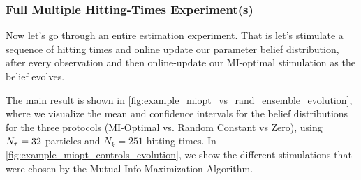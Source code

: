 \subsubsection{Full Multiple Hitting-Times Experiment(s)}
Now let's go through an entire estimation experiment. That is let's stimulate a
sequence of hitting times and online update our parameter belief distribution,
after every observation and then online-update our MI-optimal stimulation as the
belief evolves.

The main result is shown in \cref{fig:example_miopt_vs_rand_ensemble_evolution},
where we visualize the mean and confidence intervals for the belief
distributions for the three protocols (MI-Optimal vs. Random Constant vs Zero),
using $N_{\tau} = 32$ particles and $N_k=251$ hitting times. In
\cref{fig:example_miopt_controls_evolution}, we show the different stimulations
that were chosen by the Mutual-Info Maximization Algorithm.
 
